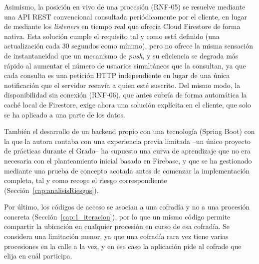 Asimismo, la posición en vivo de una procesión (RNF-05) se resuelve mediante una API REST convencional consultada periódicamente por el cliente, en lugar de mediante los \emph{listeners} en tiempo real que ofrecía Cloud Firestore de forma nativa. Esta solución cumple el requisito tal y como está definido (una actualización cada 30 segundos como mínimo), pero no ofrece la misma sensación de instantaneidad que un mecanismo de \emph{push}, y su eficiencia se degrada más rápido al aumentar el número de usuarios simultáneos que la consultan, ya que cada consulta es una petición HTTP independiente en lugar de una única notificación que el servidor reenvía a quien esté suscrito. Del mismo modo, la disponibilidad sin conexión (RNF-06), que antes cubría de forma automática la caché local de Firestore, exige ahora una solución explícita en el cliente, que solo se ha aplicado a una parte de los datos.
 
También el desarrollo de un backend propio con una tecnología (Spring Boot) con la que la autora contaba con una experiencia previa limitada --un único proyecto de prácticas durante el Grado-- ha supuesto una curva de aprendizaje que no era necesaria con el planteamiento inicial basado en Firebase, y que se ha gestionado mediante una prueba de concepto acotada antes de comenzar la implementación completa, tal y como recoge el riesgo correspondiente (Sección~\ref{cap:analisisRiesgos}).
 
Por último, los códigos de acceso se asocian a una cofradía y no a una procesión concreta (Sección~\ref{cap:1_iteracion}), por lo que un mismo código permite compartir la ubicación en cualquier procesión en curso de esa cofradía. Se considera una limitación menor, ya que una cofradía rara vez tiene varias procesiones en la calle a la vez, y en ese caso la aplicación pide al cofrade que elija en cuál participa.